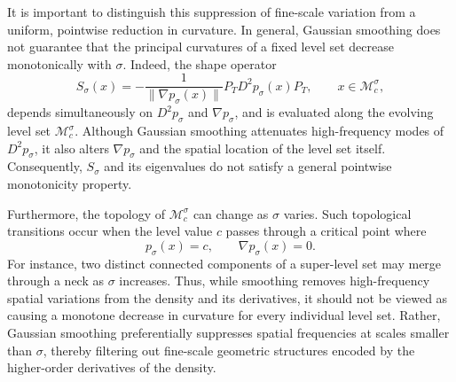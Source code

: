 \documentclass{article}
\newcommand{\M}{\mathcal{M}}
\theoremstyle{plain}
\theoremstyle{definition}
\theoremstyle{remark}
\begin{document}
It is important to distinguish this suppression of fine-scale variation from a uniform, pointwise reduction in curvature. In general, Gaussian smoothing does not guarantee that the principal curvatures of a fixed level set decrease monotonically with $\sigma$. Indeed, the shape operator
\begin{equation}
    S_\sigma(x)
    =
    -\frac{1}{\|\nabla p_\sigma(x)\|}
    P_T D^2 p_\sigma(x) P_T,
    \qquad
    x \in \M_c^\sigma,
\end{equation}
depends simultaneously on $D^2 p_\sigma$ and $\nabla p_\sigma$, and is evaluated along the evolving level set $\M_c^\sigma$. Although Gaussian smoothing attenuates high-frequency modes of $D^2 p_\sigma$, it also alters $\nabla p_\sigma$ and the spatial location of the level set itself. Consequently, $S_\sigma$ and its eigenvalues do not satisfy a general pointwise monotonicity property.

Furthermore, the topology of $\M_c^\sigma$ can change as $\sigma$ varies. Such topological transitions occur when the level value $c$ passes through a critical point where
\begin{equation}
    p_\sigma(x) = c,
    \qquad
    \nabla p_\sigma(x) = 0.
\end{equation}
For instance, two distinct connected components of a super-level set may merge through a neck as $\sigma$ increases. Thus, while smoothing removes high-frequency spatial variations from the density and its derivatives, it should not be viewed as causing a monotone decrease in curvature for every individual level set. Rather, Gaussian smoothing preferentially suppresses spatial frequencies at scales smaller than $\sigma$, thereby filtering out fine-scale geometric structures encoded by the higher-order derivatives of the density.
\end{document}
